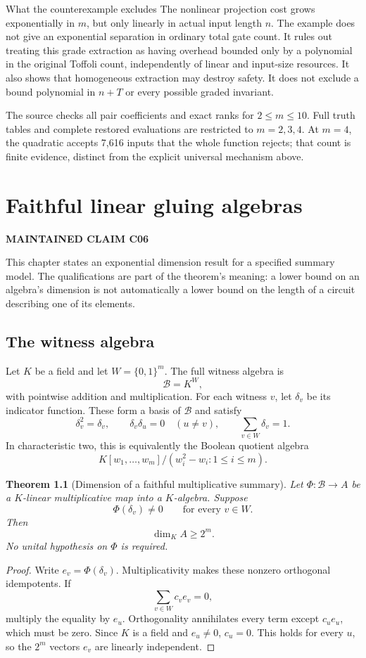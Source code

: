 \documentclass[11pt,letterpaper,oneside]{report}
\theoremstyle{komorebi}
\newtheorem{theorem}{Theorem}[chapter]
\newcommand{\B}{\{0,1\}}
\newcommand{\source}[1]{\par\smallskip{\small\sffamily\color{muted}Source alignment: #1.}\par\medskip}
\newcommand{\claim}[1]{\par{\small\sffamily\bfseries\color{accent}MAINTAINED CLAIM #1}\par\medskip}
\begin{document}
\begin{scopebox}{What the counterexample excludes}
The nonlinear projection cost grows exponentially in $m$, but only linearly in actual input length $n$. The example does not give an exponential separation in ordinary total gate count. It rules out treating this grade extraction as having overhead bounded only by a polynomial in the original Toffoli count, independently of linear and input-size resources. It also shows that homogeneous extraction may destroy safety. It does not exclude a bound polynomial in $n+T$ or every possible graded invariant.
\end{scopebox}
The source checks all pair coefficients and exact ranks for $2\le m\le10$. Full truth tables and complete restored evaluations are restricted to $m=2,3,4$. At $m=4$, the quadratic accepts 7,616 inputs that the whole function rejects; that count is finite evidence, distinct from the explicit universal mechanism above.

\chapter{Faithful linear gluing algebras}
\label{ch:gluing}\claim{C06}
\source{Theory \S4 \cite{theory}}
This chapter states an exponential dimension result for a specified summary model. The qualifications are part of the theorem's meaning: a lower bound on an algebra's dimension is not automatically a lower bound on the length of a circuit describing one of its elements.

\section{The witness algebra}
Let $K$ be a field and let $W=\B^m$. The full witness algebra is
\[
 \mathcal B=K^W,
\]
with pointwise addition and multiplication. For each witness $v$, let $\delta_v$ be its indicator function. These form a basis of $\mathcal B$ and satisfy
\[
 \delta_v^2=\delta_v,\qquad
 \delta_v\delta_u=0\quad(u\ne v),\qquad
 \sum_{v\in W}\delta_v=1.
\]
In characteristic two, this is equivalently the Boolean quotient algebra
\[
 K[w_1,\ldots,w_m]/(w_i^2-w_i:1\le i\le m).
\]

\begin{theorem}[Dimension of a faithful multiplicative summary]\label{thm:gluing-dim}
Let $\Phi:\mathcal B\to A$ be a $K$-linear multiplicative map into a $K$-algebra. Suppose
\[
 \Phi(\delta_v)\ne0\qquad\text{for every }v\in W.
\]
Then
\[
 \dim_K A\ge2^m.
\]
No unital hypothesis on $\Phi$ is required.
\end{theorem}
\begin{proof}
Write $e_v=\Phi(\delta_v)$. Multiplicativity makes these nonzero orthogonal idempotents. If
\[
 \sum_{v\in W}c_ve_v=0,
\]
multiply the equality by $e_u$. Orthogonality annihilates every term except $c_ue_u$, which must be zero. Since $K$ is a field and $e_u\ne0$, $c_u=0$. This holds for every $u$, so the $2^m$ vectors $e_v$ are linearly independent.
\end{proof}
\end{document}
